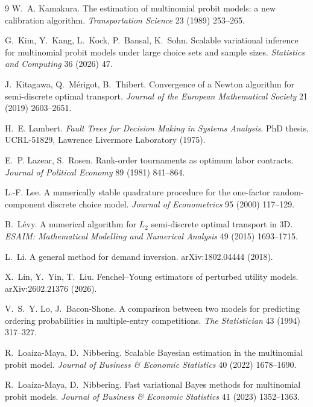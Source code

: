 \documentclass[12pt]{article}
\theoremstyle{remark}
\begin{document}
\begin{thebibliography}{9}
 W.~A. Kamakura. The estimation
of multinomial probit models: a new calibration algorithm.
\emph{Transportation Science} 23 (1989) 253--265.

G.~Kim, Y.~Kang, L.~Kock, P.~Bansal, K.~Sohn. Scalable variational
inference for multinomial probit models under large choice sets and
sample sizes. \emph{Statistics and Computing} 36 (2026) 47.

 J.~Kitagawa, Q.~M\'erigot, B.~Thibert. Convergence of
a Newton algorithm for semi-discrete optimal transport. \emph{Journal
of the European Mathematical Society} 21 (2019) 2603--2651.

 H.~E. Lambert. \emph{Fault Trees
for Decision Making in Systems Analysis}. PhD thesis, UCRL-51829,
Lawrence Livermore Laboratory (1975).

 E.~P. Lazear, S.~Rosen.
Rank-order tournaments as optimum labor contracts. \emph{Journal of
Political Economy} 89 (1981) 841--864.

 L.-F. Lee. A numerically stable quadrature
procedure for the one-factor random-component discrete choice model.
\emph{Journal of Econometrics} 95 (2000) 117--129.

 B.~L\'evy. A numerical algorithm for
$L_2$ semi-discrete optimal transport in 3D. \emph{ESAIM: Mathematical
Modelling and Numerical Analysis} 49 (2015) 1693--1715.

 L.~Li. A general method for demand
inversion. arXiv:1802.04444 (2018).

 X.~Lin,
Y.~Yin, T.~Liu. Fenchel--Young estimators of perturbed utility
models. arXiv:2602.21376 (2026).

 V.~S.~Y. Lo, J.~Bacon-Shone.
A comparison between two models for predicting ordering probabilities in
multiple-entry competitions. \emph{The Statistician} 43 (1994) 317--327.

 R.~Loaiza-Maya, D.~Nibbering. Scalable Bayesian
estimation in the multinomial probit model. \emph{Journal of Business \&
Economic Statistics} 40 (2022) 1678--1690.

 R.~Loaiza-Maya,
D.~Nibbering. Fast variational Bayes methods for multinomial probit
models. \emph{Journal of Business \& Economic Statistics} 41 (2023)
1352--1363.


\end{thebibliography}
\end{document}
